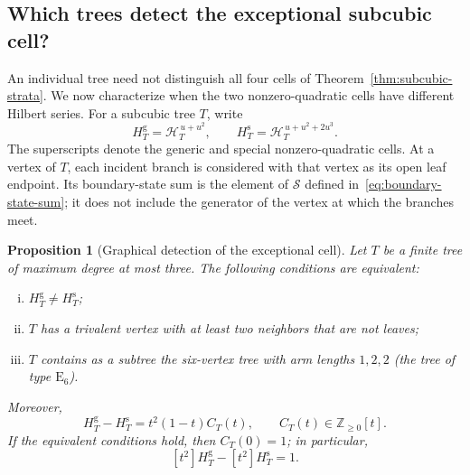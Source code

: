 \documentclass[reqno]{article}
\theoremstyle{plain} %
\newtheorem{proposition}[theorem]{Proposition}
\theoremstyle{definition}
\theoremstyle{remark}
\newcommand{\Z}{{\mathbb{Z}}}
\newcommand{\hs}{\mathscr{H}}
\numberwithin{equation}{section}
\begin{document}
\subsection{Which trees detect the exceptional subcubic cell?}
\label{sec:subcubic-visibility}

An individual tree need not distinguish all four cells of
Theorem~\ref{thm:subcubic-strata}. We now characterize when the two
nonzero-quadratic cells have different Hilbert series. For a subcubic tree
$T$, write
\[
H_T^{\mathrm g}=\hs_T^{\,u+u^2},\qquad
H_T^{\mathrm s}=\hs_T^{\,u+u^2+2u^3}.
\]
The superscripts denote the generic and special nonzero-quadratic cells.
At a vertex of $T$, each incident branch is considered with that vertex
as its open leaf endpoint. Its boundary-state sum is the element of
$\mathcal S$ defined in~\eqref{eq:boundary-state-sum}; it does not
include the generator of the vertex at which the branches meet.

\begin{proposition}[Graphical detection of the exceptional cell]
\label{prop:subcubic-visibility}
Let $T$ be a finite tree of maximum degree at most three. The following
conditions are equivalent:
\begin{enumerate}[(i)]
\item $H_T^{\mathrm g}\ne H_T^{\mathrm s}$;
\item $T$ has a trivalent vertex with at least two neighbors that are not
leaves;
\item $T$ contains as a subtree the six-vertex tree with arm lengths
$1,2,2$ (the tree of type $\mathrm E_6$).
\end{enumerate}
Moreover,
\begin{equation}\label{eq:subcubic-visibility-defect}
H_T^{\mathrm g}-H_T^{\mathrm s}=t^2(1-t)C_T(t),
\qquad C_T(t)\in\Z_{\ge0}[t].
\end{equation}
If the equivalent conditions hold, then $C_T(0)=1$; in particular,
\begin{equation}\label{eq:subcubic-quadratic-drop}
[t^2]H_T^{\mathrm g}-[t^2]H_T^{\mathrm s}=1.
\end{equation}
\end{proposition}
\end{document}
